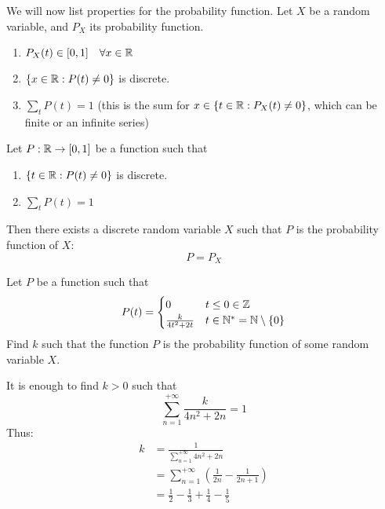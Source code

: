 \documentclass{article}
\begin{document}
	We will now list properties for the probability function. Let $X$ be a random variable, and $P_X$ its probability function.
	\begin{enumerate} 
		\item $P_X (t) \in [0,1] \quad \forall x \in \mathbb{R}$ 
		\item $\{ x \in \mathbb{R}: P(t) \neq 0 \}$ is discrete.
		\item $\sum_t P(t) =1$  (this is the sum for $x \in \{ t \in \mathbb{R}: P_X (t) \neq 0 \}$, which can be finite or an infinite series)
	\end{enumerate}
	\begin{prop}
		Let $P : \mathbb{R} \to [0,1]$ be a function such that
		\begin{enumerate}
			\item $\{ t \in \mathbb{R}: P(t) \neq 0 \}$ is discrete.
			\item $\sum_t P(t) = 1 $
		\end{enumerate}
		Then there exists a discrete random variable $X$ such that $P$ is the probability function of $X$:
		$$ P=P_X$$
	\end{prop}
	\begin{exmp}
		Let $P$ be a function such that
		$$ P(t) = 
		\begin{cases}
		0 & t \leq 0 \in \mathbb{Z} \\
		\frac{k}{4t^2 + 2t} & t\in \mathbb{N}^* = \mathbb{N} \setminus \{0\}
		\end{cases}
		$$
		Find $k$ such that the function $P$ is the probability function of some random variable $X$.
	\end{exmp}
	\begin{sol}
		It is enough to find $k > 0$ such that 
		$$ \sum_{n=1}^{+\infty} \frac{k}{4n^2 + 2n} = 1$$
		Thus:
		\begin{align*}
			k&= \frac{1}{\sum_{n=1}^{+\infty} 4n^2 + 2n}  \\
			&= \sum_{n=1}^{+\infty} \left( \frac{1}{2n} - \frac{1}{2n+1}\right) \\
			&= \frac{1}{2} - \frac{1}{3} + \frac{1}{4} - \frac{1}{5}
		\end{align*}
	\end{sol}
\end{document}
